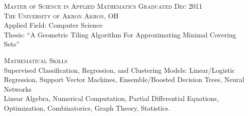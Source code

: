 \documentclass[letterpaper, 11pt]{article} %
\begin{document}



\hrulefill

\textsc{Master of Science in Applied Mathematics} \hfill \textsc{Graduated Dec 2011} \\
\textsc{The University of Akron \hfill Akron, OH} \\
Applied Field: Computer Science \\
Thesis: ``A Geometric Tiling Algorithm For Approximating Minimal Covering Sets'' \




\hrulefill

\textsc{Mathematical Skills} \\
    Supervised Classification, Regression, and Clustering Models:
    Linear/Logistic Regression,
    Support Vector Machines,
    Ensemble/Boosted Decision Trees,
    Neural Networks \\
    Linear Algebra,
    Numerical Computation,
    Partial Differential Equations,
    Optimization,
    Combinatorics,
    Graph Theory,
    Statistics.
    
\end{document}
